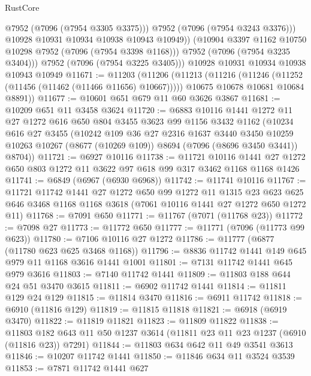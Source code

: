 \begin{lexlean}{RustCore}
\begin{coremodule}
                @7952
                (@7096 (@7954 @3305 @3375)))
              @7952
              (@7096 (@7954 @3243 @3376)))
            @10928
            @10931
            @10934
            @10938
            @10943
            @10949))
        (@10904 @3397 @1162 @10750 @10298 @7952 (@7096 (@7954 @3398 @1168)))
        @7952
        (@7096 (@7954 @3235 @3404)))
      @7952
      (@7096 (@7954 @3225 @3405)))
    @10928
    @10931
    @10934
    @10938
    @10943
    @10949
@11671 := @11203
    (@11206
      (@11213
        (@11216 (@11246 (@11252 (@11456 (@11462 (@11466 @11656) @10667)))))
        @10675
        @10678
        @10681
        @10684
        @8891))
@11677 := @10601 @651 @679 @11 @60 @3626 @3867
@11681 := @10209 @651 @11 @3458 @3624
@11720 := @6883
    @10116
    @1441
    @1272
    @11
    @27
    @1272
    @616
    @650
    @804
    @3455
    @3623
    @99
    @1156
    @3432
    @1162
    (@10234
      @616
      @27
      @3455
      (@10242
        @109
        @36
        @27
        @2316
        @1637
        @3440
        @3450
        @10259
        @10263
        @10267
        (@8677 (@10269 @109))
        @8694
        (@7096 (@8696 @3450 @3441))
        @8704))
@11721 := @6927 @10116
@11738 := @11721
    @10116
    @1441
    @27
    @1272
    @650
    @803
    @1272
    @11
    @3622
    @97
    @618
    @99
    @317
    @3462
    @1168
    @1168
    @1426
@11741 := @6849 (@6967 (@6930 @6968))
@11742 := @11741 @10116
@11767 := @11721
    @11742
    @1441
    @27
    @1272
    @650
    @99
    @1272
    @11
    @1315
    @23
    @623
    @625
    @646
    @3468
    @1168
    @1168
    @3618
    (@7061 @10116 @1441 @27 @1272 @650 @1272 @11)
@11768 := @7091 @650
@11771 := @11767 (@7071 (@11768 @23))
@11772 := @7098 @27
@11773 := @11772 @650
@11777 := @11771 (@7096 (@11773 @99 @623))
@11780 := @7106 @10116 @27 @1272
@11786 := @11777 (@6877 (@11780 @623 @625 @3468 @1168))
@11796 := @8836 @11742 @1441 @149 @645 @979 @11 @1168 @3616 @1441 @1001
@11801 := @7131 @11742 @1441 @645 @979 @3616
@11803 := @7140 @11742 @1441
@11809 := @11803 @188 @644 @24 @51 @3470 @3615
@11811 := @6902 @11742 @1441
@11814 := @11811 @129 @24 @129
@11815 := @11814 @3470
@11816 := @6911 @11742
@11818 := @6910 (@11816 @129)
@11819 := @11815 @11818
@11821 := @6918 (@6919 @3470)
@11822 := @11819 @11821
@11823 := @11809 @11822
@11838 := @11803 @182 @643 @11 @50 @1237 @3614 (@11811 @23 @11 @23 @1237 (@6910 (@11816 @23)) @7291)
@11844 := @11803 @634 @642 @11 @49 @3541 @3613
@11846 := @10207 @11742 @1441
@11850 := @11846 @634 @11 @3524 @3539
@11853 := @7871 @11742 @1441 @627

\end{coremodule}
\end{lexlean}
